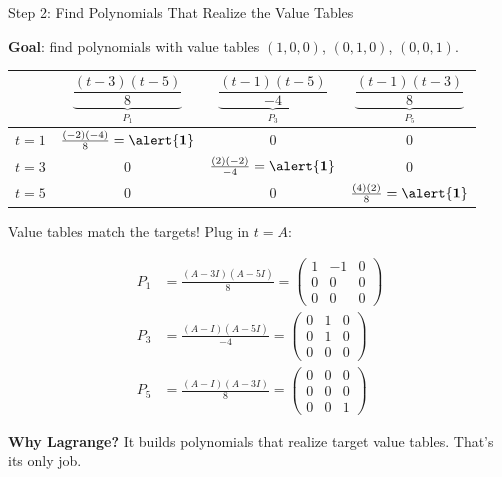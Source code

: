 \documentclass[10pt]{beamer}
\theoremstyle{definition}
\newcommand{\x}[1]{\alert{\textbf{#1}}}
\begin{document}
%
%
\begin{frame}[shrink=5]{Step 2: Find Polynomials That Realize the Value Tables}

\x{Goal}: find polynomials with value tables $(1,0,0)$, $(0,1,0)$, $(0,0,1)$.

\vfill

\begin{center}
\renewcommand{\arraystretch}{1.5}
\begin{tabular}{c|ccc}
 & $\underbrace{\dfrac{(t-3)(t-5)}{8}}_{P_1}$
 & $\underbrace{\dfrac{(t-1)(t-5)}{-4}}_{P_3}$
 & $\underbrace{\dfrac{(t-1)(t-3)}{8}}_{P_5}$ \\[6pt]
\hline
$t = 1$ & $\frac{(-2)(-4)}{8} = \x{1}$ & $0$ & $0$ \\[4pt]
$t = 3$ & $0$ & $\frac{(2)(-2)}{-4} = \x{1}$ & $0$ \\[4pt]
$t = 5$ & $0$ & $0$ & $\frac{(4)(2)}{8} = \x{1}$
\end{tabular}
\end{center}

\vfill\pause

Value tables match the targets! Plug in $t = A$:

\begin{align*}
P_1 &= \tfrac{(A-3I)(A-5I)}{8} = \begin{pmatrix}1&-1&0\\0&0&0\\0&0&0\end{pmatrix} \\[2pt]
P_3 &= \tfrac{(A-I)(A-5I)}{-4} = \begin{pmatrix}0&1&0\\0&1&0\\0&0&0\end{pmatrix} \\[2pt]
P_5 &= \tfrac{(A-I)(A-3I)}{8} = \begin{pmatrix}0&0&0\\0&0&0\\0&0&1\end{pmatrix}
\end{align*}

\vfill

\x{Why Lagrange?} It builds polynomials that realize target value tables. That's its only job.

\end{frame}
\end{document}
